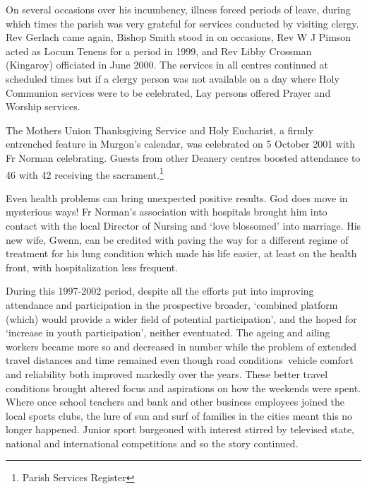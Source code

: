 On several occasions over his incumbency, illness forced periods of leave, during which times the parish was very grateful for services conducted by visiting clergy. Rev Gerlach came again, Bishop Smith stood in on occasions, Rev W J Pimson acted as Locum Tenens for a period in 1999, and Rev Libby Crossman (Kingaroy) officiated in June 2000. The services in all centres continued at scheduled times but if a clergy person was not available on a day where Holy Communion services were to be celebrated, Lay persons offered Prayer and Worship services.



The Mothers Union Thanksgiving Service and Holy Eucharist, a firmly entrenched feature in Murgon's calendar, was celebrated on 5 October 2001 with Fr Norman celebrating. Guests from other Deanery centres boosted attendance to 46 with 42 receiving the sacrament.\footnote{Parish Services Register}


Even health problems can bring unexpected positive results. God does move in mysterious ways! Fr Norman's association with hospitals brought him into contact with the local Director of Nursing and `love blossomed' into marriage. His new wife, Gwenn, can be credited with paving the way for a different regime of treatment for his lung condition which made his life easier, at least on the health front, with hospitalization less frequent.



During this 1997-2002 period, despite all the efforts put into improving attendance and participation in the prospective broader, `combined platform (which) would provide a wider field of potential participation', and the hoped for `increase in youth participation', neither eventuated. The ageing and ailing workers became more so and decreased in number while the problem of extended travel distances and time remained even though road conditions~vehicle comfort and reliability both improved markedly over the years. These better travel conditions brought altered focus and aspirations on how the weekends were spent. Where once school teachers and bank and other business employees joined the local sports clubs, the lure of sun and surf of families in the cities meant this no longer happened. Junior sport burgeoned with interest stirred by televised state, national and international competitions and so the story continued.



